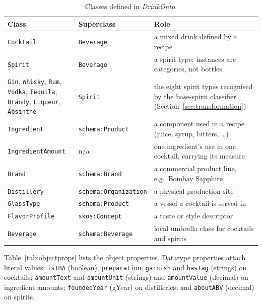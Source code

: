 \begin{table}[h]
  \centering
  \small
  \begin{tabular}{@{}p{4.0cm}p{3.9cm}p{6.6cm}@{}}
    \toprule
    Class & Superclass & Role \\
    \midrule
    \texttt{Cocktail} & \texttt{Beverage} & a mixed drink defined by a recipe \\
    \texttt{Spirit} & \texttt{Beverage} & a spirit type; instances are categories, not bottles \\
    \texttt{Gin}, \texttt{Whisky}, \texttt{Rum}, \texttt{Vodka}, \texttt{Tequila}, \texttt{Brandy}, \texttt{Liqueur}, \texttt{Absinthe} & \texttt{Spirit} & the eight spirit types recognised by the base-spirit classifier (Section~\ref{sec:transformation}) \\
    \texttt{Ingredient} & \texttt{schema:Product} & a component used in a recipe (juice, syrup, bitters, \dots) \\
    \texttt{IngredientAmount} & n/a & one ingredient's use in one cocktail, carrying its measure \\
    \texttt{Brand} & \texttt{schema:Brand} & a commercial product line, e.g.\ Bombay Sapphire \\
    \texttt{Distillery} & \texttt{schema:Organization} & a physical production site \\
    \texttt{GlassType} & \texttt{schema:Product} & a vessel a cocktail is served in \\
    \texttt{FlavorProfile} & \texttt{skos:Concept} & a taste or style descriptor \\
    \texttt{Beverage} & \texttt{schema:Beverage} & local umbrella class for cocktails and spirits \\
    \bottomrule
  \end{tabular}
  \caption{Classes defined in \emph{DrinkOnto}.}
  \label{tab:classes}
\end{table}

Table~\ref{tab:objectprops} lists the object properties. Datatype properties
attach literal values: \texttt{isIBA} (boolean), \texttt{preparation},
\texttt{garnish} and \texttt{hasTag} (strings) on cocktails;
\texttt{amountText} and \texttt{amountUnit} (strings) and \texttt{amountValue}
(decimal) on ingredient amounts; \texttt{foundedYear} (gYear) on distilleries;
and \texttt{aboutABV} (decimal) on spirits.

